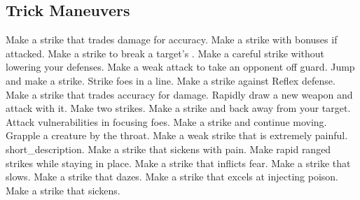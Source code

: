 \small
\subsection{Trick Maneuvers}\label{Trick Maneuvers}
\begin{spelllist}
 Make a strike that trades damage for accuracy.
 Make a strike with bonuses if attacked.
 Make a strike to break a target's .
 Make a careful strike without lowering your defenses.
 Make a weak attack to take an opponent off guard.
 Jump and make a strike.
 Strike foes in a line.
 Make a strike against Reflex defense.
 Make a strike that trades accuracy for damage.
 Rapidly draw a new weapon and attack with it.
 Make two strikes.
 Make a strike and back away from your target.
 Attack vulnerabilities in focusing foes.
 Make a strike and continue moving.
 Grapple a creature by the throat.
 Make a weak strike that is extremely painful.
 short_description.
 Make a strike that sickens with pain.
 Make rapid ranged strikes while staying in place.
 Make a strike that inflicts fear.
 Make a strike that slows.
 Make a strike that dazes.
 Make a strike that excels at injecting poison.
 Make a strike that sickens.
\end{spelllist}



\small
